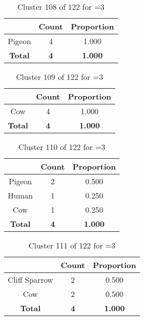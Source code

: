 \begin{table}[ht!]
\centering
\begin{tabular}{|c|c|c|}
\hline
\bf \Spec{} &\bf Count &\bf Proportion\\ \hline \hline
Pigeon & 4 & 1.000\\ \hline
\hline
\bf Total & \bf 4 & \bf 1.000\\ \hline
\end{tabular}
\label{tab:cluster:108:3}
\caption{Cluster 108 of 122 for \minneigh{}=3}
\end{table}

\begin{table}[ht!]
\centering
\begin{tabular}{|c|c|c|}
\hline
\bf \Spec{} &\bf Count &\bf Proportion\\ \hline \hline
Cow & 4 & 1.000\\ \hline
\hline
\bf Total & \bf 4 & \bf 1.000\\ \hline
\end{tabular}
\label{tab:cluster:109:3}
\caption{Cluster 109 of 122 for \minneigh{}=3}
\end{table}

\clearpage
\begin{table}[ht!]
\centering
\begin{tabular}{|c|c|c|}
\hline
\bf \Spec{} &\bf Count &\bf Proportion\\ \hline \hline
Pigeon & 2 & 0.500\\ \hline
Human & 1 & 0.250\\ \hline
Cow & 1 & 0.250\\ \hline
\hline
\bf Total & \bf 4 & \bf 1.000\\ \hline
\end{tabular}
\label{tab:cluster:110:3}
\caption{Cluster 110 of 122 for \minneigh{}=3}
\end{table}

\begin{table}[ht!]
\centering
\begin{tabular}{|c|c|c|}
\hline
\bf \Spec{} &\bf Count &\bf Proportion\\ \hline \hline
Cliff Sparrow & 2 & 0.500\\ \hline
Cow & 2 & 0.500\\ \hline
\hline
\bf Total & \bf 4 & \bf 1.000\\ \hline
\end{tabular}
\label{tab:cluster:111:3}
\caption{Cluster 111 of 122 for \minneigh{}=3}
\end{table}

